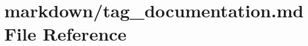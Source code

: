 \hypertarget{tag__documentation_8md}{}\section{markdown/tag\+\_\+documentation.md File Reference}
\label{tag__documentation_8md}
